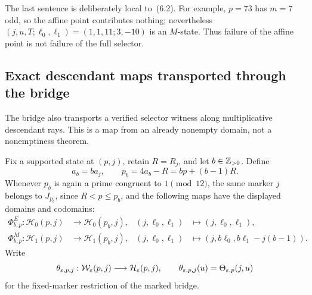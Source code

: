 The last sentence is deliberately local to~(6.2).  For example, \(p=73\)
has \(m=7\) odd, so the affine point contributes nothing; nevertheless
\((j,u,T;\ell_0,\ell_1)=(1,1,11;3,-10)\) is an \(M\)-state.  Thus failure of
the affine point is not failure of the full selector.

\subsection{Exact descendant maps transported through the bridge}

The bridge also transports a verified selector witness along multiplicative
descendant rays.  This is a map from an already nonempty domain, not a
nonemptiness theorem.

Fix a supported state at \((p,j)\), retain \(R=R_j\), and let \(b\in\mathbb Z_{>0}\).
Define
\begin{equation}
 a_b=ba_j,
 \qquad p_b=4a_b-R=bp+(b-1)R.                               \tag{7.1}
\end{equation}
Whenever \(p_b\) is again a prime congruent to \(1\pmod {12}\), the same
marker \(j\) belongs to \(J_{p_b}\), since \(R<p\leq p_b\), and the following
maps have the displayed domains and codomains:
\begin{align}
 \Phi_{b;p}^E:\mathcal H_0(p,j)&\longrightarrow\mathcal H_0(p_b,j),
 &(j,\ell_0,\ell_1)&\longmapsto(j,\ell_0,\ell_1),             \tag{7.2}\\
 \Phi_{b;p}^M:\mathcal H_1(p,j)&\longrightarrow\mathcal H_1(p_b,j),
 &(j,\ell_0,\ell_1)&\longmapsto
 (j,b\ell_0,b\ell_1-j(b-1)).                               \tag{7.3}
\end{align}
Write
\[
 \theta_{\varepsilon,p,j}:\mathcal W_\varepsilon(p,j)\longrightarrow
 \mathcal H_\varepsilon(p,j),
 \qquad
 \theta_{\varepsilon,p,j}(u)=\Theta_{\varepsilon,p}(j,u)
\]
for the fixed-marker restriction of the marked bridge.

